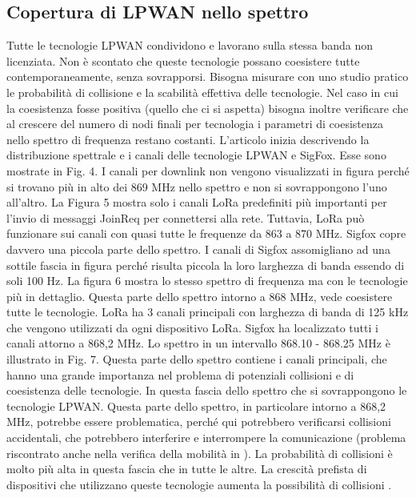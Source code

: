 \documentclass[a4paper]{report} %
\begin{document}
\subsection{Copertura di LPWAN nello spettro}
Tutte le tecnologie LPWAN condividono e lavorano sulla stessa banda non licenziata. Non è scontato che queste tecnologie possano coesistere tutte contemporaneamente, senza sovrapporsi. Bisogna misurare con uno studio pratico le probabilità di collisione e la scabilità effettiva delle tecnologie. Nel caso in cui la coesistenza fosse positiva (quello che ci si aspetta) bisogna inoltre verificare che al crescere del numero di nodi finali per tecnologia i parametri di coesistenza nello spettro di frequenza restano costanti.
L'articolo \cite{art:rif.46} inizia descrivendo la distribuzione spettrale e i canali delle tecnologie LPWAN e SigFox. Esse sono mostrate in Fig. 4. I canali per downlink non vengono visualizzati in figura perché si trovano più in alto dei 869 MHz nello spettro e non si sovrappongono l'uno all'altro. La Figura 5 mostra solo i canali LoRa predefiniti più importanti per l'invio di messaggi JoinReq per connettersi alla rete. Tuttavia, LoRa può funzionare sui canali con quasi tutte le frequenze da 863 a 870 MHz. Sigfox copre davvero una piccola parte dello spettro. I canali di Sigfox assomigliano ad una sottile fascia in figura perché risulta piccola la loro larghezza di banda essendo di soli 100 Hz. 
La figura 6 mostra lo stesso spettro di frequenza ma con le tecnologie più in dettaglio. Questa parte dello spettro intorno a 868 MHz, vede coesistere tutte le tecnologie. LoRa ha 3 canali principali con larghezza di banda di 125 kHz che vengono utilizzati da ogni dispositivo LoRa. Sigfox ha localizzato tutti i canali attorno a 868,2 MHz. Lo spettro in un intervallo 868.10 - 868.25 MHz è illustrato in Fig. 7. Questa parte dello spettro contiene i canali principali, che hanno una grande importanza nel problema di potenziali collisioni e di coesistenza delle tecnologie. In questa fascia dello spettro che si sovrappongono le tecnologie LPWAN. Questa parte dello spettro, in particolare intorno a 868,2 MHz, potrebbe essere problematica, perché qui potrebbero verificarsi collisioni accidentali, che potrebbero interferire e interrompere la comunicazione (problema riscontrato anche nella verifica della mobilità in \cite{art:rif.47}). La probabilità di collisioni è molto più alta in questa fascia che in tutte le altre. La crescità prefista  di dispositivi che utilizzano queste tecnologie aumenta la possibilità di collisioni \cite{art:rif.46}.
\end{document}
